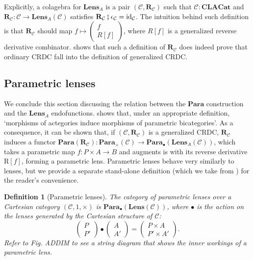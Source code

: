 \documentclass[11pt,a4paper,openright,twoside]{report}
\newcounter{mycounter}
\theoremstyle{plain}
\newtheorem{definition}[mycounter]{Definition}
\theoremstyle{definition}
\begin{document}
Explicitly, a colagebra for $\mathbf{Lens}_A$ is a pair $(\mathcal{C}, \mathbf{R}_{\mathcal{C}})$ such that $\mathcal{C}: \mathbf{CLACat}$ and $\mathbf{R}_{\mathcal{C}}: \mathcal{C} \to \mathbf{Lens}_A(\mathcal{C})$ satisfies $\mathbf{R}_{\mathcal{C}} \fatsemi \epsilon_{\mathcal{C}} = \mathrm{id}_{\mathcal{C}}$. The intuition behind such definition is that $\mathbf{R}_{\mathcal{C}}$ should map $f \mapsto \left(\begin{smallmatrix} f \\ R[f] \end{smallmatrix}\right)$, where $R[f]$ is a generalized reverse derivative combinator. \cite{gavranovic2024fundamental} shows that such a definition of $\mathbf{R}_{\mathcal{C}}$ does indeed prove that ordinary CRDC fall into the definition of generalized CRDC. 


\subsection{Parametric lenses}

We conclude this section discussing the relation between the $\mathbf{Para}$ construction and the $\mathbf{Lens}_A$ endofunctions. \cite{gavranovic2024fundamental} shows that, under an appropriate definition, \lq morphisms of actegories induce morphisms of parametric bicategories\rq. As a consequence, it can be shown that, if  $(\mathcal{C}, \mathbf{R}_{\mathcal{C}})$ is a generalized CRDC,  $\mathbf{R}_{\mathcal{C}}$ induces a functor $\mathbf{Para}(\mathbf{R}_{\mathcal{C}}): \mathbf{Para}_{\times}(\mathcal{C}) \to \mathbf{Para}_{\bullet}(\mathbf{Lens}_A(\mathcal{C}))$, which takes a parametric map $f: P \times A \to B$ and augments is with its reverse derivative $\mathrm{R}[f]$, forming a parametric lens. Parametric lenses behave very similarly to lenses, but we provide a separate stand-alone definition (which we take from \cite{cruttwell2022categorical}) for the reader's convenience.

\begin{definition}[Parametric lenses]
  The category of parametric lenses over a Cartesian category $(\mathcal{C},1,\times)$ is $\mathbf{Para}_{\bullet}(\mathbf{Lens}(\mathcal{C}))$, where $\bullet$ is the action on the lenses generated by the Cartesian structure of $\mathcal{C}$:
  \[\begin{pmatrix}
    P \\ P'
  \end{pmatrix} \bullet \begin{pmatrix}
    A \\ A'
  \end{pmatrix} = \begin{pmatrix}
    P \times A \\ P' \times A'
  \end{pmatrix}.\]
  Refer to \textit{Fig. ADDIM} to see a string diagram that shows the inner workings of a parametric lens.
\end{definition}
\end{document}
